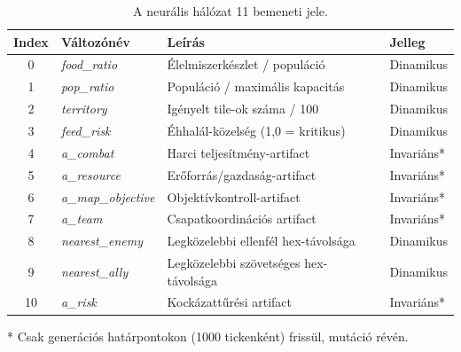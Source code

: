 \begin{table}[h]
  \centering
  \caption{A neurális hálózat 11 bemeneti jele.}
  \label{tab:neurosim-inputs}
  \begin{tabular}{clll}
    \hline
    \textbf{Index} & \textbf{Változónév} & \textbf{Leírás} & \textbf{Jelleg} \\
    \hline
    0 & \textit{food\_ratio}         & Élelmiszerkészlet / populáció         & Dinamikus \\
    1 & \textit{pop\_ratio}          & Populáció / maximális kapacitás        & Dinamikus \\
    2 & \textit{territory}           & Igényelt tile-ok száma / 100           & Dinamikus \\
    3 & \textit{feed\_risk}          & Éhhalál-közelség (1{,}0 = kritikus)   & Dinamikus \\
    4 & \textit{a\_combat}           & Harci teljesítmény-artifact             & Invariáns* \\
    5 & \textit{a\_resource}         & Erőforrás/gazdaság-artifact             & Invariáns* \\
    6 & \textit{a\_map\_objective}   & Objektívkontroll-artifact               & Invariáns* \\
    7 & \textit{a\_team}             & Csapatkoordinációs artifact             & Invariáns* \\
    8 & \textit{nearest\_enemy}      & Legközelebbi ellenfél hex-távolsága    & Dinamikus \\
    9 & \textit{nearest\_ally}       & Legközelebbi szövetséges hex-távolsága & Dinamikus \\
   10 & \textit{a\_risk}             & Kockázattűrési artifact                 & Invariáns* \\
    \hline
  \end{tabular}
  \begin{flushleft}
    \small{* Csak generációs határpontokon (1000 tickenként) frissül, mutáció révén.}
  \end{flushleft}
\end{table}

